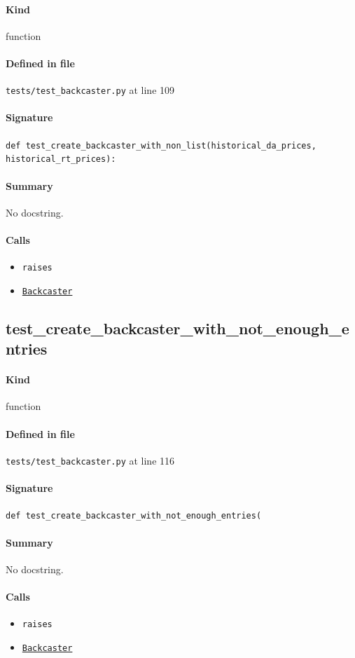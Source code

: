 \documentclass[11pt]{report}
\begin{document}
\paragraph{Kind} function
\paragraph{Defined in file} \texttt{tests/test\_backcaster.py} at line 109
\paragraph{Signature} \texttt{def test\_create\_backcaster\_with\_non\_list(historical\_da\_prices, historical\_rt\_prices):}
\paragraph{Summary} No docstring.
\paragraph{Calls}
\begin{itemize}[leftmargin=*]
  \item \texttt{raises}
  \item \hyperref[def:forecaster.py:Backcaster:L321]{\texttt{Backcaster}}
\end{itemize}
\subsection{test\_create\_backcaster\_with\_not\_enough\_entries}
\label{def:tests-test_backcaster.py:test_create_backcaster_with_not_enough_entries:L116}
\paragraph{Kind} function
\paragraph{Defined in file} \texttt{tests/test\_backcaster.py} at line 116
\paragraph{Signature} \texttt{def test\_create\_backcaster\_with\_not\_enough\_entries(}
\paragraph{Summary} No docstring.
\paragraph{Calls}
\begin{itemize}[leftmargin=*]
  \item \texttt{raises}
  \item \hyperref[def:forecaster.py:Backcaster:L321]{\texttt{Backcaster}}
\end{itemize}
\end{document}

